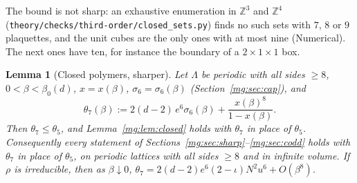 \documentclass[11pt,a4paper]{article}
\newtheorem{lemma}[theorem]{Lemma}
\theoremstyle{definition}
\theoremstyle{remark}
\newcommand{\Z}{\mathbb{Z}}
\begin{document}
The bound is not sharp: an exhaustive enumeration in $\Z^3$ and $\Z^4$ (\texttt{theory/checks/third-order/closed\_sets.py}) finds no such sets with $7$, $8$ or $9$
plaquettes, and the unit cubes are the only ones with at most nine (Numerical). The next ones have ten, for instance the boundary of a $2\times1\times1$ box.

\begin{lemma}[Closed polymers, sharper]\label{mg:lem:theta7}
Let $\Lambda$ be periodic with all sides $\ge8$, $0<\beta<\beta_0(d)$, $x=x(\beta)$, $\sigma_6=\sigma_6(\beta)$ (Section~\ref{mg:sec:cap}), and
\[
\theta_7(\beta):=2(d-2)\,e^6\sigma_6(\beta)+\frac{x(\beta)^8}{1-x(\beta)} .
\]
Then $\theta_7\le\theta_5$, and Lemma~\ref{mg:lem:closed} holds with $\theta_7$ in place of $\theta_5$. Consequently every statement of
Sections~\ref{mg:sec:sharp}--\ref{mg:sec:codd} holds with $\theta_7$ in place of $\theta_5$, on periodic lattices with all sides $\ge8$ and in infinite volume. If $\rho$ is irreducible,
then as $\beta\downarrow0$, $\theta_7=2(d-2)e^6(2-\iota)N^2u^6+O(\beta^8)$.
\end{lemma}
\end{document}
